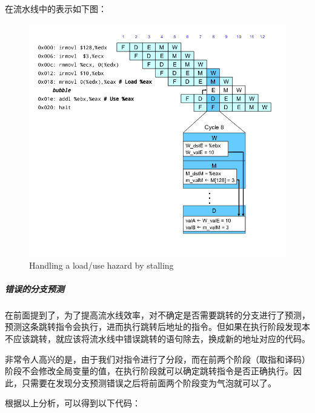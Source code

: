 在流水线中的表示如下图：

\begin{figure}[htbp]
\centering
\includegraphics{img/prog5-stall.png}
\caption{Handling a load/use hazard by stalling}
\end{figure}

\subparagraph{错误的分支预测}\label{ux9519ux8befux7684ux5206ux652fux9884ux6d4b}

在前面提到了，为了提高流水线效率，对不确定是否需要跳转的分支进行了预测，预测这条跳转指令会执行，进而执行跳转后地址的指令。但如果在执行阶段发现本不应该跳转，就应该将流水线中错误跳转的语句除去，换成新的地址对应的代码。

非常令人高兴的是，由于我们对指令进行了分段，而在前两个阶段（取指和译码）阶段不会修改全局变量的值，在执行阶段就可以确定跳转指令是否正确执行。因此，只需要在发现分支预测错误之后将前面两个阶段变为气泡就可以了。

根据以上分析，可以得到以下代码：

